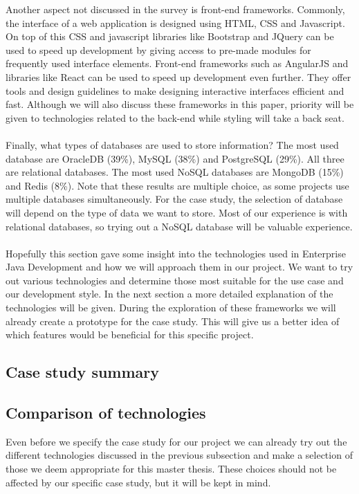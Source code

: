 \documentclass[12pt]{article}
\begin{document}
Another aspect not discussed in the survey is front-end frameworks. Commonly, the interface of a web application is designed using HTML, CSS and Javascript. On top of this CSS and javascript libraries like Bootstrap and JQuery can be used to speed up development by giving access to pre-made modules for frequently used interface elements. Front-end frameworks such as AngularJS and libraries like React can be used to speed up development even further. They offer tools and design guidelines to make designing interactive interfaces efficient and fast. Although we will also discuss these frameworks in this paper, priority will be given to technologies related to the back-end while styling will take a back seat.
\\\\
Finally, what types of databases are used to store information? The most used database are OracleDB (39\%), MySQL (38\%) and PostgreSQL (29\%). All three are relational databases. The most used NoSQL databases are MongoDB (15\%) and Redis (8\%). Note that these results are multiple choice, as some projects use multiple databases simultaneously. For the case study, the selection of database will depend on the type of data we want to store. Most of our experience is with relational databases, so trying out a NoSQL database will be valuable experience.
\\\\
Hopefully this section gave some insight into the technologies used in Enterprise Java Development and how we will approach them in our project. We want to try out various technologies and determine those most suitable for the use case and our development style. In the next section a more detailed explanation of the technologies will be given. During the exploration of these frameworks we will already create a prototype for the case study. This will give us a better idea of which features would be beneficial for this specific project.

\subsection{Case study summary}
\subsection{Comparison of technologies}
Even before we specify the case study for our project we can already try out the different technologies discussed in the previous subsection and make a selection of those we deem appropriate for this master thesis. These choices should not be affected by our specific case study, but it will be kept in mind.
\end{document}
